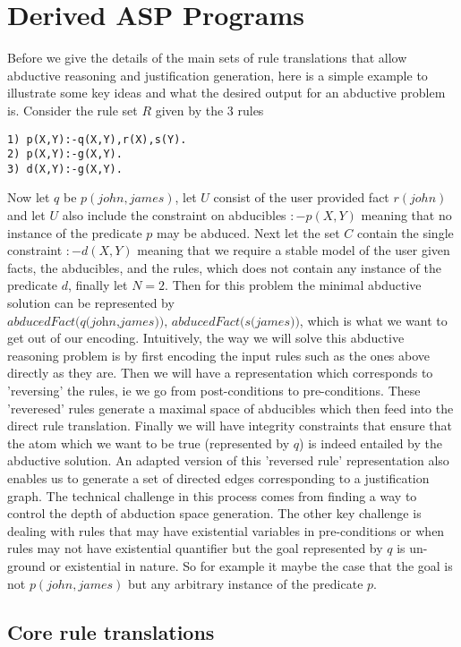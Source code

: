 \documentclass{article}
\begin{document}
\section{Derived ASP Programs}\label{sec:derived_asp}
Before we give the details of the main sets of rule translations that allow abductive reasoning and justification generation, here is a simple example to illustrate some key ideas and what the desired output for an abductive problem is. Consider the rule set $R$ given by the 3 rules
\begin{verbatim}
1) p(X,Y):-q(X,Y),r(X),s(Y).
2) p(X,Y):-g(X,Y).
3) d(X,Y):-g(X,Y).
\end{verbatim}
Now let $q$ be $p(john,james)$, let $U$ consist of the user provided fact $r(john)$ and let $U$ also include the constraint on abducibles $:-p(X,Y)$ meaning that no instance of the predicate $p$ may be abduced. Next let the set $C$ contain the single constraint $:-d(X,Y)$ meaning that we require a stable model of the user given facts, the abducibles, and the rules, which does not contain any instance of the predicate $d$, finally let $N = 2$. Then for this problem the minimal abductive solution can be represented by $\textit{abducedFact(q(john,james)), abducedFact(s(james))}$, which is what we want to get out of our encoding. Intuitively, the way we will solve this abductive reasoning problem is by first encoding the input rules such as the ones above directly as they are. Then we will have a representation which corresponds to 'reversing' the rules, ie we go from post-conditions to pre-conditions. These 'reveresed' rules generate a maximal space of abducibles which then feed into the direct rule translation. Finally we will have integrity constraints that ensure that the atom which we want to be true (represented by $q$) is indeed entailed by the abductive solution. An adapted version of this 'reversed rule' representation also enables us to generate a set of directed edges corresponding to a justification graph. The technical challenge in this process comes from finding a way to control the depth of abduction space generation. The other key challenge is dealing with rules that may have existential variables in pre-conditions or when rules may not have existential quantifier but the goal represented by $q$ is un-ground or existential in nature. So for example it maybe the case that the goal is not $p(john,james)$ but any arbitrary instance of the predicate $p$.    

\subsection{Core rule translations}
\end{document}
